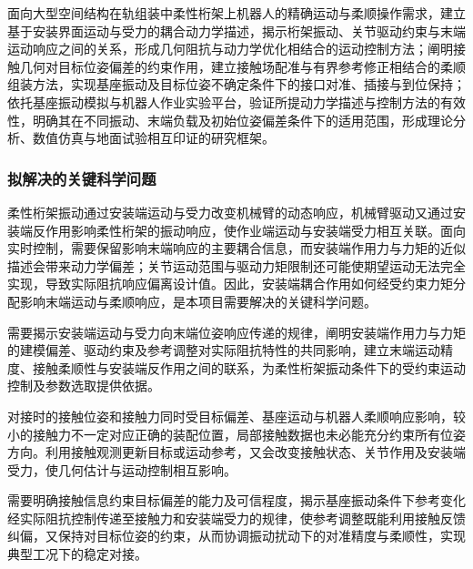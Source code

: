 面向大型空间结构在轨组装中柔性桁架上机器人的精确运动与柔顺操作需求，建立基于安装界面运动与受力的耦合动力学描述，揭示桁架振动、关节驱动约束与末端运动响应之间的关系，形成几何阻抗与动力学优化相结合的运动控制方法；阐明接触几何对目标位姿偏差的约束作用，建立接触场配准与有界参考修正相结合的柔顺组装方法，实现基座振动及目标位姿不确定条件下的接口对准、插接与到位保持；依托基座振动模拟与机器人作业实验平台，验证所提动力学描述与控制方法的有效性，明确其在不同振动、末端负载及初始位姿偏差条件下的适用范围，形成理论分析、数值仿真与地面试验相互印证的研究框架。

\subsubsection{拟解决的关键科学问题}


柔性桁架振动通过安装端运动与受力改变机械臂的动态响应，机械臂驱动又通过安装端反作用影响柔性桁架的振动响应，使作业端运动与安装端受力相互关联。面向实时控制，需要保留影响末端响应的主要耦合信息，而安装端作用力与力矩的近似描述会带来动力学偏差；关节运动范围与驱动力矩限制还可能使期望运动无法完全实现，导致实际阻抗响应偏离设计值。因此，安装端耦合作用如何经受约束力矩分配影响末端运动与柔顺响应，是本项目需要解决的关键科学问题。

需要揭示安装端运动与受力向末端位姿响应传递的规律，阐明安装端作用力与力矩的建模偏差、驱动约束及参考调整对实际阻抗特性的共同影响，建立末端运动精度、接触柔顺性与安装端反作用之间的联系，为柔性桁架振动条件下的受约束运动控制及参数选取提供依据。


对接时的接触位姿和接触力同时受目标偏差、基座运动与机器人柔顺响应影响，较小的接触力不一定对应正确的装配位置，局部接触数据也未必能充分约束所有位姿方向。利用接触观测更新目标或运动参考，又会改变接触状态、关节作用及安装端受力，使几何估计与运动控制相互影响。

需要明确接触信息约束目标偏差的能力及可信程度，揭示基座振动条件下参考变化经实际阻抗控制传递至接触力和安装端受力的规律，使参考调整既能利用接触反馈纠偏，又保持对目标位姿的约束，从而协调振动扰动下的对准精度与柔顺性，实现典型工况下的稳定对接。

